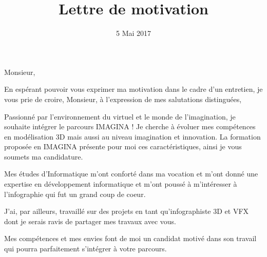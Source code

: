 \documentclass[11pt,a4paper,sans]{moderncv}
\title{Lettre de motivation}
\begin{document}
\date{5 Mai 2017}
\opening{Monsieur,}
\closing{En espérant pouvoir vous exprimer ma motivation dans le cadre d’un entretien, je vous prie de croire, Monsieur, à l’expression de mes salutations distinguées,}
\makelettertitle

Passionné par l'environnement du virtuel et le monde de l'imagination, je souhaite intégrer le parcours IMAGINA ! Je cherche à évoluer mes compétences en modélisation 3D mais aussi au niveau imagination et innovation. La formation proposée en IMAGINA présente pour moi ces caractéristiques, ainsi je vous soumets ma candidature.

Mes études d'Informatique m’ont conforté dans ma vocation et m’ont donné une expertise en développement informatique et m'ont poussé à m'intéresser à l'infographie qui fut un grand coup de coeur.

J'ai, par ailleurs, travaillé sur des projets en tant qu'infographiste 3D et VFX dont je serais ravis de partager mes travaux avec vous.

Mes compétences et mes envies font de moi un candidat motivé dans son travail qui pourra parfaitement s’intégrer à votre parcours.

\makeletterclosing
\end{document}

